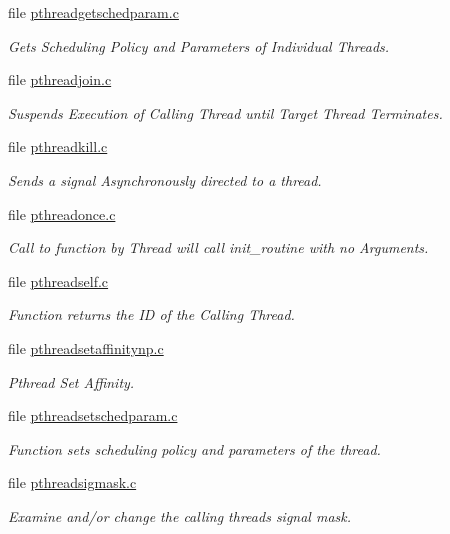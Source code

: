 \begin{DoxyCompactItemize}
file \mbox{\hyperlink{pthreadgetschedparam_8c}{pthreadgetschedparam.\+c}}
\begin{DoxyCompactList}\small\item\em Gets Scheduling Policy and Parameters of Individual Threads. \end{DoxyCompactList}\item 
file \mbox{\hyperlink{pthreadjoin_8c}{pthreadjoin.\+c}}
\begin{DoxyCompactList}\small\item\em Suspends Execution of Calling Thread until Target Thread Terminates. \end{DoxyCompactList}\item 
file \mbox{\hyperlink{pthreadkill_8c}{pthreadkill.\+c}}
\begin{DoxyCompactList}\small\item\em Sends a signal Asynchronously directed to a thread. \end{DoxyCompactList}\item 
file \mbox{\hyperlink{pthreadonce_8c}{pthreadonce.\+c}}
\begin{DoxyCompactList}\small\item\em Call to function by Thread will call init\+\_\+routine with no Arguments. \end{DoxyCompactList}\item 
file \mbox{\hyperlink{pthreadself_8c}{pthreadself.\+c}}
\begin{DoxyCompactList}\small\item\em Function returns the ID of the Calling Thread. \end{DoxyCompactList}\item 
file \mbox{\hyperlink{pthreadsetaffinitynp_8c}{pthreadsetaffinitynp.\+c}}
\begin{DoxyCompactList}\small\item\em Pthread Set Affinity. \end{DoxyCompactList}\item 
file \mbox{\hyperlink{pthreadsetschedparam_8c}{pthreadsetschedparam.\+c}}
\begin{DoxyCompactList}\small\item\em Function sets scheduling policy and parameters of the thread. \end{DoxyCompactList}\item 
file \mbox{\hyperlink{pthreadsigmask_8c}{pthreadsigmask.\+c}}
\begin{DoxyCompactList}\small\item\em Examine and/or change the calling thread\textquotesingle{}s signal mask. \end{DoxyCompactList}\item 

\end{DoxyCompactItemize}
